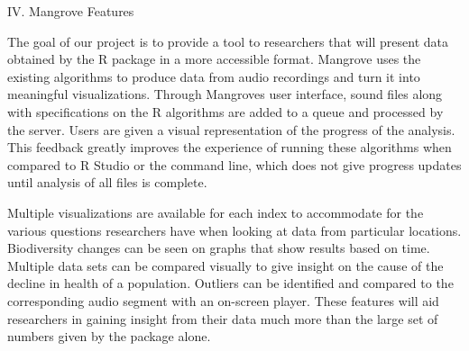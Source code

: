 \begin{center}
IV. Mangrove Features
\end{center}
\begin{flushleft}
\setlength{\parindent}{0.125in}
The goal of our project is to provide a tool to researchers that will present data obtained by the R  package in a more accessible format. Mangrove uses the existing  algorithms to produce data from audio recordings and turn it into meaningful visualizations. Through Mangrove\textquotesingle s user interface, sound files along with specifications on the R algorithms are added to a queue and processed by the server. Users are given a visual representation of the progress of the analysis. This feedback greatly improves the experience of running these algorithms when compared to R Studio or the command line, which does not give progress updates until analysis of all files is complete.\par
Multiple visualizations are available for each index to accommodate for the various questions  researchers have when looking at data from particular locations. Biodiversity changes can be seen on graphs that show results based on time. Multiple data sets can be compared visually to give insight on the cause of the decline in health of a population. Outliers can be identified and compared to the corresponding audio segment with an on-screen player. These features will aid researchers in gaining insight from their data much more than the large set of numbers given by the  package alone.\par
\pagebreak[2]
\end{flushleft}
